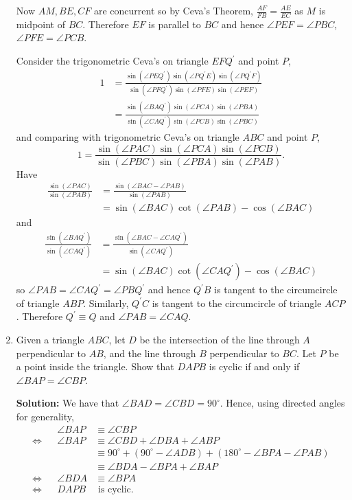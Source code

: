 \documentclass{article}
\newcommand{\solution}[1]{%
\ifsolutions%
    \textbf{Solution: } #1
\fi
}
\begin{document}
\begin{enumerate}
{Now $AM, BE, CF$ are concurrent so by Ceva's Theorem, $\frac{AF}{FB} = \frac{AE}{EC}$ as $M$ is midpoint of $BC$. Therefore $EF$ is parallel to $BC$ and hence $\angle PEF = \angle PBC$, $\angle PFE = \angle PCB$.

Consider the trigonometric Ceva's on triangle $EFQ^\prime$ and point $P$,
\begin{align*}
    1 & = \frac{\sin(\angle PEQ^\prime) \sin(\angle PQ^\prime E) \sin(\angle PQ^\prime F)}{\sin(\angle PFQ^\prime) \sin(\angle PFE) \sin(\angle PEF)} \\
    & = \frac{\sin(\angle BAQ^\prime) \sin(\angle PCA) \sin(\angle PBA)}{\sin(\angle CAQ^\prime) \sin(\angle PCB) \sin(\angle PBC)}
\end{align*}
and comparing with trigonometric Ceva's on triangle $ABC$ and point $P$,
\[
    1 = \frac{\sin(\angle PAC) \sin(\angle PCA) \sin(\angle PCB)}{\sin(\angle PBC) \sin(\angle PBA) \sin(\angle PAB)}.
\]
Have 
\begin{align*}
    \frac{\sin(\angle PAC)}{\sin(\angle PAB)} & = \frac{\sin(\angle BAC - \angle PAB)}{\sin(\angle PAB)}  \\
    & = \sin(\angle BAC) \cot(\angle PAB) - \cos(\angle BAC)
\end{align*}
and
\begin{align*}
    \frac{\sin(\angle BAQ^\prime)}{\sin(\angle CAQ^\prime)} & = \frac{\sin(\angle BAC - \angle CAQ^\prime)}{\sin(\angle CAQ^\prime)} \\
    & = \sin(\angle BAC) \cot(\angle CAQ^\prime) - \cos(\angle BAC)
\end{align*}
so $\angle PAB = \angle CAQ^\prime = \angle PBQ^\prime$ and hence $Q^\prime B$ is tangent to the circumcircle of triangle $ABP$. Similarly, $Q^\prime C$ is tangent to the circumcircle of triangle $ACP$. Therefore $Q^\prime \equiv Q$ and $\angle PAB = \angle CAQ$.
}

\item\label{problem:geometry_trivial}
Given a triangle $ABC$, let $D$ be the intersection of the line through $A$ perpendicular to $AB$, and the line through $B$ perpendicular to $BC$. Let $P$ be a point inside the triangle. Show that $DAPB$ is cyclic if and only if $\angle BAP = \angle CBP$.

\solution{%
We have that $\angle BAD = \angle CBD = 90^\circ$. Hence, using directed angles for generality,
\begin{align*}
        & & \angle BAP & \equiv \angle CBP \\
    \iff & & \angle BAP & \equiv \angle CBD + \angle DBA + \angle ABP \\
        & &   & \equiv 90^\circ + (90^\circ - \angle ADB) + (180^\circ - \angle BPA - \angle PAB) \\
        & &   & \equiv \angle BDA - \angle BPA + \angle BAP \\
    \iff & & \angle BDA & \equiv \angle BPA \\
    \iff & & DAPB & \text{ is cyclic.}
\end{align*}

}
\end{enumerate}
\end{document}
